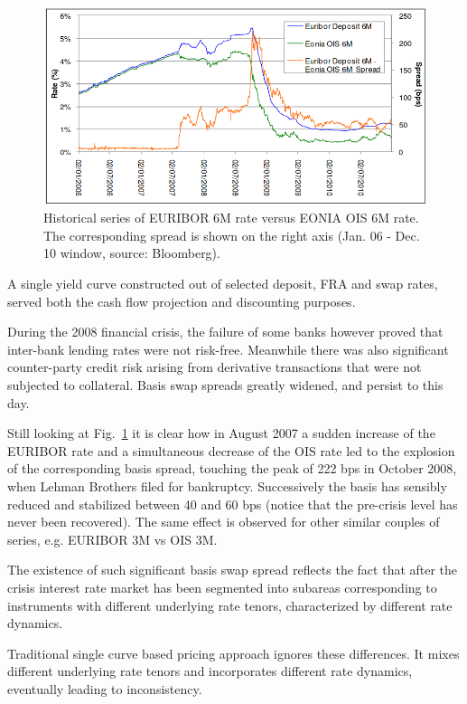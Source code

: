 \begin{figure}[htb]
	\centering
	\includegraphics[width=0.9\linewidth]{figures/credit_crunch.png}
	\caption{Historical series of EURIBOR 6M rate versus EONIA OIS 6M rate. The corresponding spread 
		is shown on the right axis (Jan. 06 - Dec. 10 window, source: Bloomberg).}
	\label{fig:credit_crunch}
\end{figure}

A single yield curve constructed out of selected deposit, FRA and swap rates, served both the cash flow projection and discounting purposes.

During the 2008 financial crisis, the failure of some banks however proved that inter-bank lending rates were not risk-free. Meanwhile there was also significant counter-party credit risk arising from derivative transactions that were not subjected to collateral. Basis swap spreads greatly widened, and persist to this day. 

Still looking at Fig.~\ref{fig:credit_crunch} it is clear how in August 2007 a sudden increase of the EURIBOR rate and a simultaneous decrease of the OIS rate led to the explosion of the corresponding basis spread, touching the peak of 222 bps in October 2008, when Lehman Brothers filed for bankruptcy. Successively the basis has sensibly reduced and stabilized between 40 and 60 bps (notice that the pre-crisis level has never been recovered). The same effect is observed for other similar couples of series, e.g. EURIBOR 3M vs OIS 3M.

The existence of such significant basis swap spread reflects the fact that after the crisis interest rate market has been segmented into subareas corresponding to instruments with different underlying rate tenors, characterized by different rate dynamics. 

Traditional single curve based pricing approach ignores these differences. It mixes different underlying rate tenors and incorporates different rate dynamics, eventually leading to inconsistency.

